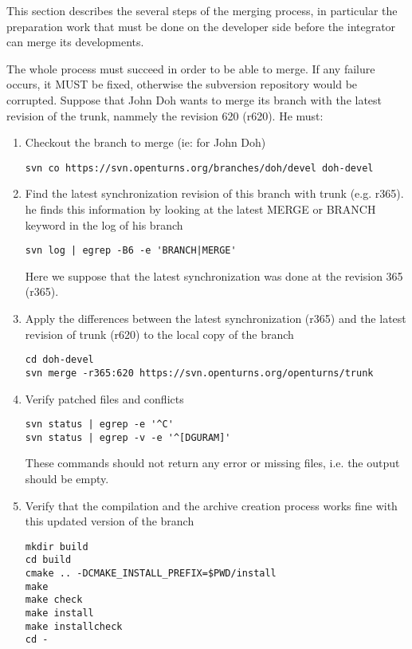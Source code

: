This section describes the several steps of the merging process, in particular the preparation work that must be done on the developer side before the integrator can merge its developments.

The whole process must succeed in order to be able to merge. If any failure occurs, it MUST be fixed, otherwise the subversion repository would be corrupted. Suppose that John Doh wants to merge its branch with the latest revision of the trunk, nammely the revision 620 (r620). He must:
\begin{enumerate}
\item Checkout the branch to merge (ie: for John Doh)

\begin{lstlisting}
svn co https://svn.openturns.org/branches/doh/devel doh-devel
\end{lstlisting}

\item Find the latest synchronization revision of this branch with trunk (e.g. r365). he finds this information by looking at the latest MERGE or BRANCH keyword in the log of his branch
\begin{lstlisting}
svn log | egrep -B6 -e 'BRANCH|MERGE'
\end{lstlisting}

Here we suppose that the latest synchronization was done at the revision 365 (r365).
\item Apply the differences between the latest synchronization (r365) and the latest revision of trunk (r620) to the local copy of the branch

\begin{lstlisting}
cd doh-devel
svn merge -r365:620 https://svn.openturns.org/openturns/trunk
\end{lstlisting}

\item Verify patched files and conflicts

\begin{lstlisting}
svn status | egrep -e '^C'
svn status | egrep -v -e '^[DGURAM]'
\end{lstlisting}

These commands should not return any error or missing files, i.e. the output should be empty.
\item Verify that the compilation and the archive creation process works fine with this updated version of the branch

\begin{lstlisting}
mkdir build
cd build
cmake .. -DCMAKE_INSTALL_PREFIX=$PWD/install
make
make check
make install
make installcheck
cd -
\end{lstlisting}


\end{enumerate}
